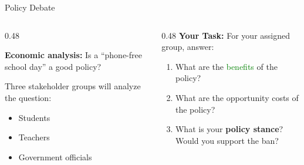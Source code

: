 \documentclass[9pt,english,aspectratio=169]{beamer}
\begin{document}
\begin{frame}{Policy Debate}

  \begin{columns}[c]
    \begin{column}{0.48\textwidth}
      \begin{questionbox}
        \textbf{Economic analysis:} Is a ``phone-free school day'' a good policy?
      \end{questionbox}

      \vspace{0.5em}
      Three stakeholder groups will analyze the question:
      \begin{itemize}
        \item Students
        \item Teachers
        \item Government officials
      \end{itemize}

    \end{column}
    \begin{column}{0.48\textwidth}
      \textbf{Your Task:} For your assigned group, answer:
      \vspace{0.3em}

      \begin{enumerate}
        \item What are the \textcolor{green}{benefits} of the policy?
        \vspace{0.3em}
        \item What are the \textcolor{vermillion}{opportunity costs} of the policy?
        \vspace{0.3em}
        \item What is your \textbf{policy stance}? Would you support the ban?
      \end{enumerate}
    \end{column}
  \end{columns}

\end{frame}

\end{document}
